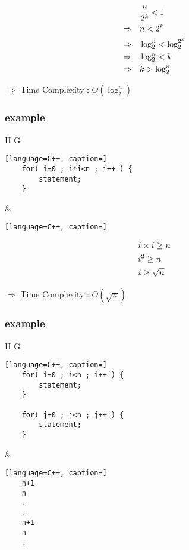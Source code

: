 \documentclass[12pt]{article}
\begin{document}
\begin{align*}
\Large
&\cfrac{n}{2^{k}} < 1 \\
\Rightarrow \quad & n < 2^{k} \\
\Rightarrow \quad & \log^{n}_{2} < \log^{2^{k}}_{2} \\
\Rightarrow \quad & \log^{n}_{2} < k \\
\Rightarrow \quad & k > \log^{n}_{2} \\
\end{align*}


$\Rightarrow$ Time Complexity : $O(\log^{n}_{2})$




\newpage


\subsubsection{example}


\begin{center}
  \bgroup
  \def\arraystretch{1.5}%
  \begin{tabular}{ H  G  }
	\begin{lstlisting}[language=C++, caption=]
	for( i=0 ; i*i<n ; i++ ) {
		statement;
	}
	\end{lstlisting}
     &  
	\begin{lstlisting}[language=C++, caption=]

	\end{lstlisting}
  \end{tabular}
  \egroup
\end{center}


\begin{align*}
\Large
& i \times i \geq n  \\
& i^{2} \geq n  \\
& i \geq \sqrt{n}  \\
\end{align*}


$\Rightarrow$ Time Complexity : $O(\sqrt{n})$






\subsubsection{example}


\begin{center}
  \bgroup
  \def\arraystretch{1.5}%
  \begin{tabular}{ H  G  }
	\begin{lstlisting}[language=C++, caption=]
	for( i=0 ; i<n ; i++ ) {
		statement;
	}
	
	for( j=0 ; j<n ; j++ ) {
		statement;
	}
	\end{lstlisting}
     &  
	\begin{lstlisting}[language=C++, caption=]
	n+1
	n
	.
	.
	n+1
	n
	.
	\end{lstlisting}
  \end{tabular}
  \egroup
\end{center}
\end{document}
